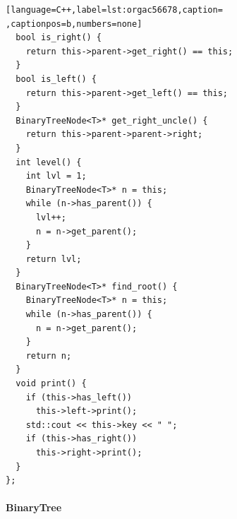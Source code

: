 \documentclass[a4paper,12pt]{article}
\begin{document}
\begin{lstlisting}[language=C++,label=lst:orgac56678,caption= ,captionpos=b,numbers=none]
  bool is_right() {
    return this->parent->get_right() == this;
  }
  bool is_left() {
    return this->parent->get_left() == this;
  }
  BinaryTreeNode<T>* get_right_uncle() {
    return this->parent->parent->right;
  }
  int level() {
    int lvl = 1;
    BinaryTreeNode<T>* n = this;
    while (n->has_parent()) {
      lvl++;
      n = n->get_parent();
    }
    return lvl;
  }
  BinaryTreeNode<T>* find_root() {
    BinaryTreeNode<T>* n = this;
    while (n->has_parent()) {
      n = n->get_parent();
    }
    return n;
  }
  void print() {
    if (this->has_left())
      this->left->print();
    std::cout << this->key << " ";
    if (this->has_right())
      this->right->print();
  }
};
\end{lstlisting}
\paragraph{BinaryTree}
\label{sec:orge246581}
\end{document}
